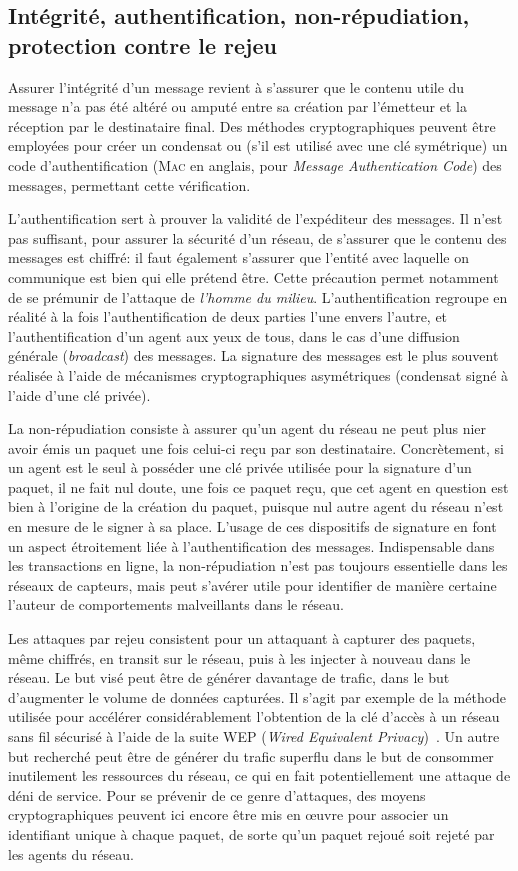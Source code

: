 \subsection{Intégrité, authentification, non-répudiation, protection contre le rejeu}

Assurer l'intégrité d'un message revient à s'assurer que le contenu utile du message n'a pas été altéré ou amputé entre sa création par l'émetteur et la réception par le destinataire final.
Des méthodes cryptographiques peuvent être employées pour créer un condensat ou (s'il est utilisé avec une clé symétrique) un code d'authentification (\textsc{Mac} en anglais, pour \textit{Message Authentication Code}) des messages, permettant cette vérification.

L'authentification sert à prouver la validité de l'expéditeur des messages.
Il n'est pas suffisant, pour assurer la sécurité d'un réseau, de s'assurer que le contenu des messages est chiffré: il faut également s'assurer que l'entité avec laquelle on communique est bien qui elle prétend être.
Cette précaution permet notamment de se prémunir de l'attaque de \textit{l'homme du milieu}.
L'authentification regroupe en réalité à la fois l'authentification de deux parties l'une envers l'autre, et l'authentification d'un agent aux yeux de tous, dans le cas d'une diffusion générale (\textit{broadcast}) des messages.
La signature des messages est le plus souvent réalisée à l'aide de mécanismes cryptographiques asymétriques (condensat signé à l'aide d'une clé privée).

La non-répudiation consiste à assurer qu'un agent du réseau ne peut plus nier avoir émis un paquet une fois celui-ci reçu par son destinataire.
Concrètement, si un agent est le seul à posséder une clé privée utilisée pour la signature d'un paquet, il ne fait nul doute, une fois ce paquet reçu, que cet agent en question est bien à l'origine de la création du paquet, puisque nul autre agent du réseau n'est en mesure de le signer à sa place.
L'usage de ces dispositifs de signature en font un aspect étroitement liée à l'authentification des messages.
Indispensable dans les transactions en ligne, la non-répudiation n'est pas toujours essentielle dans les réseaux de capteurs, mais peut s'avérer utile pour identifier de manière certaine l'auteur de comportements malveillants dans le réseau.

Les attaques par rejeu consistent pour un attaquant à capturer des paquets, même chiffrés, en transit sur le réseau, puis à les injecter à nouveau dans le réseau.
Le but visé peut être de générer davantage de trafic, dans le but d'augmenter le volume de données capturées.
Il s'agit par exemple de la méthode utilisée pour accélérer considérablement l'obtention de la clé d'accès à un réseau sans fil sécurisé à l'aide de la suite WEP (\textit{Wired Equivalent Privacy})~\cite{BGW01}.
Un autre but recherché peut être de générer du trafic superflu dans le but de consommer inutilement les ressources du réseau, ce qui en fait potentiellement une attaque de déni de service.
Pour se prévenir de ce genre d'attaques, des moyens cryptographiques peuvent ici encore être mis en œuvre pour associer un identifiant unique à chaque paquet, de sorte qu'un paquet rejoué soit rejeté par les agents du réseau.

